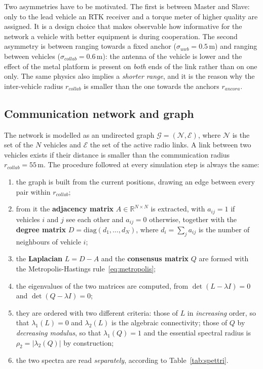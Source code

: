 \documentclass[conference,9pt]{IEEEtran}
\begin{document}
Two asymmetries have to be motivated. The first is between Master and Slave:
only to the lead vehicle an RTK receiver and a torque meter of higher quality
are assigned. It is a design choice that makes observable how informative for
the network a vehicle with better equipment is during cooperation. The second
asymmetry is between ranging towards a fixed anchor ($\sigma_{uwb} = 0.5$\,m)
and ranging between vehicles ($\sigma_{collab} = 0.6$\,m): the antenna of the
vehicle is
lower and the effect of the metal platform is present on \emph{both} ends of
the link rather than on one only. The same physics also implies a
\emph{shorter range}, and it is the reason why the inter-vehicle radius
$r_{collab}$ is smaller than the one towards the anchors $r_{ancora}$.

\subsection{Communication network and graph}
\label{sub:grafo}

The network is modelled as an undirected graph
$\mathcal{G} = (\mathcal{N}, \mathcal{E})$, where $\mathcal{N}$ is the set of
the $N$ vehicles and $\mathcal{E}$ the set of the active radio links.
A link between two vehicles exists if their distance is smaller than the
communication radius $r_{collab} = 55$\,m. The procedure followed at every
simulation step is always the same:

\begin{enumerate}
\item the graph is built from the current positions, drawing an edge between
      every pair within $r_{collab}$;
\item from it the \textbf{adjacency matrix}
      $A \in \mathbb{R}^{N\times N}$ is extracted, with $a_{ij}=1$ if vehicles
      $i$ and $j$ see each other and $a_{ij}=0$ otherwise, together with the
      \textbf{degree matrix} $D = \mathrm{diag}(d_1,\dots,d_N)$, where
      $d_i = \sum_j a_{ij}$ is the number of neighbours of vehicle $i$;
\item the \textbf{Laplacian} $L = D - A$ and the \textbf{consensus matrix} $Q$
      are formed with the Metropolis-Hastings
      rule~\eqref{eq:metropolis};
\item the eigenvalues of the two matrices are computed, from
      $\det(L - \lambda I)=0$ and $\det(Q - \lambda I)=0$;
\item they are ordered with two different criteria: those of $L$ in
      \emph{increasing} order, so that $\lambda_1(L) = 0$ and $\lambda_2(L)$ is
      the algebraic connectivity; those of $Q$ by \emph{decreasing modulus}, so
      that $\lambda_1(Q) = 1$ and the essential spectral radius is
      $\rho_2 = |\lambda_2(Q)|$ by construction;
\item the two spectra are read \emph{separately}, according to
      Table~\ref{tab:spettri}.
\end{enumerate}
\end{document}
